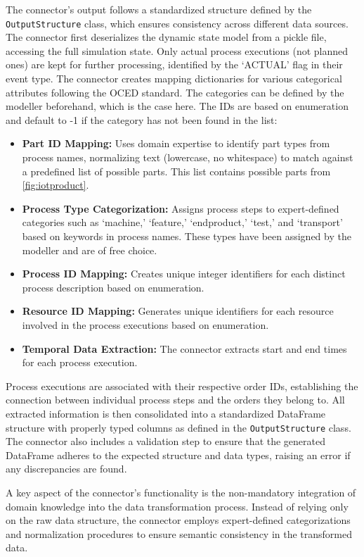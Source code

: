 The connector's output follows a standardized structure defined by the \texttt{OutputStructure} class, which ensures consistency across different data sources. The connector first deserializes the dynamic state model from a pickle file, accessing the full simulation state. Only actual process executions (not planned ones) are kept for further processing, identified by the `ACTUAL' flag in their event type. The connector creates mapping dictionaries for various categorical attributes following the OCED standard. The categories can be defined by the modeller beforehand, which is the case here. The IDs are based on enumeration and default to -1 if the category has not been found in the list:

\begin{itemize}
  \item \textbf{Part ID Mapping:} Uses domain expertise to identify part types from process names, normalizing text (lowercase, no whitespace) to match against a predefined list of possible parts. This list contains possible parts from \autoref{fig:iotproduct}.
  \item \textbf{Process Type Categorization:} Assigns process steps to expert-defined categories such as `machine,' `feature,' `endproduct,' `test,' and `transport' based on keywords in process names. These types have been assigned by the modeller and are of free choice.
  \item \textbf{Process ID Mapping:} Creates unique integer identifiers for each distinct process description based on enumeration.
  \item \textbf{Resource ID Mapping:} Generates unique identifiers for each resource involved in the process executions based on enumeration.
  \item \textbf{Temporal Data Extraction:} The connector extracts start and end times for each process execution.
\end{itemize}

Process executions are associated with their respective order IDs, establishing the connection between individual process steps and the orders they belong to. All extracted information is then consolidated into a standardized DataFrame structure with properly typed columns as defined in the \texttt{OutputStructure} class. The connector also includes a validation step to ensure that the generated DataFrame adheres to the expected structure and data types, raising an error if any discrepancies are found.

A key aspect of the connector's functionality is the non-mandatory integration of domain knowledge into the data transformation process. Instead of relying only on the raw data structure, the connector employs expert-defined categorizations and normalization procedures to ensure semantic consistency in the transformed data.

